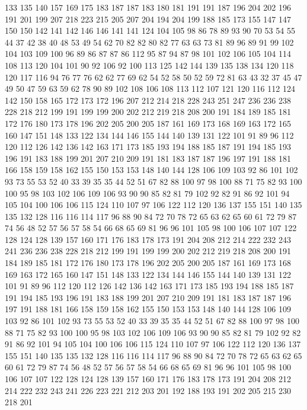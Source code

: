 133 135 140 157 169 175 183 187 187 183 180 181 191 191 187 196 204 202 196 191
201 199 207 218 223 215 205 207 204 194 204 199 188 185 173 155 147 147 150 150
142 141 142 146 146 141 141 124 104 105 98 86 78 89 93 90 70 53 54 55
44 37 42 38 40 48 53 49 54 62 70 82 82 80 82 77 63 63 73 81
89 96 89 91 99 102 104 103 109 100 96 89 86 87 87 86 112 95 87 94
87 98 101 102 106 105 104 114 108 113 120 104 101 90 92 106 92 100 113 125
142 144 139 135 138 134 120 118 120 117 116 94 76 77 76 62 62 77 69 62
54 52 58 50 52 59 72 81 63 43 32 37 45 47 49 50 47 59 63 59
62 78 90 89 102 108 106 108 113 112 107 121 120 116 112 124 142 150 158 165
172 173 172 196 207 212 214 218 228 243 251 247 236 236 238 228 218 212 199 191
199 199 200 202 212 219 218 208 200 191 184 189 185 181 172 176 180 173 178 196
202 205 200 205 187 161 169 173 168 169 163 172 165 160 147 151 148 133 122 134
144 146 155 144 140 139 131 122 101 91 89 96 112 120 112 126 142 136 142 163
171 173 185 193 194 188 185 187 191 194 185 193 196 191 183 188 199 201 207 210
209 191 181 183 187 187 196 197 191 188 181 166 158 159 158 162 155 150 153 153
148 140 144 128 106 109 103 92 86 101 102 93 73 55 53 52 40 33 39 35
35 44 52 51 67 82 88 100 97 98 100 88 71 75 82 93 100 100 95 98
103 102 106 109 106 93 90 90 85 82 81 79 102 92 82 91 86 92 101 94
105 104 100 106 106 115 124 110 107 97 106 122 112 120 136 137 155 151 140 135
135 132 128 116 116 114 117 96 88 90 84 72 70 78 72 65 63 62 65 60
61 72 79 87 74 56 48 52 57 56 57 58 54 66 68 65 69 81 96 96
101 105 98 100 106 107 107 122 128 124 128 139 157 160 171 176 183 178 173 191
204 208 212 214 222 232 243 241 236 236 238 228 218 212 199 191 199 199 200 202
212 219 218 208 200 191 184 189 185 181 172 176 180 173 178 196 202 205 200 205
187 161 169 173 168 169 163 172 165 160 147 151 148 133 122 134 144 146 155 144
140 139 131 122 101 91 89 96 112 120 112 126 142 136 142 163 171 173 185 193
194 188 185 187 191 194 185 193 196 191 183 188 199 201 207 210 209 191 181 183
187 187 196 197 191 188 181 166 158 159 158 162 155 150 153 153 148 140 144 128
106 109 103 92 86 101 102 93 73 55 53 52 40 33 39 35 35 44 52 51
67 82 88 100 97 98 100 88 71 75 82 93 100 100 95 98 103 102 106 109
106 93 90 90 85 82 81 79 102 92 82 91 86 92 101 94 105 104 100 106
106 115 124 110 107 97 106 122 112 120 136 137 155 151 140 135 135 132 128 116
116 114 117 96 88 90 84 72 70 78 72 65 63 62 65 60 61 72 79 87
74 56 48 52 57 56 57 58 54 66 68 65 69 81 96 96 101 105 98 100
106 107 107 122 128 124 128 139 157 160 171 176 183 178 173 191 204 208 212 214
222 232 243 241 226 223 221 212 203 201 192 188 193 191 202 205 215 230 218 201

